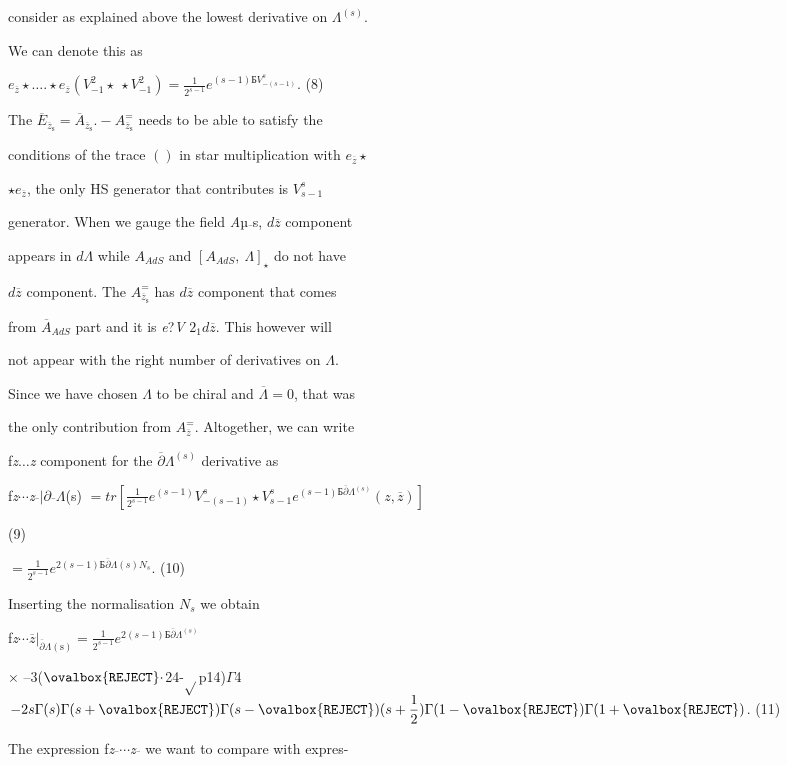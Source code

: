 \documentclass[a4paper,12pt]{article}
\begin{document}
consider as explained above the lowest derivative on $\Lambda^{(s)}.$

We can denote this as

$e_{\overline{z}}\star\ldots.\star e_{\overline{z}} (V_{-1}^{2}\displaystyle \star\ \star V_{-1}^{2})=\frac{1}{2^{s-1}}e^{(s-1)Б V_{-(s-1)}^{s}}$. (8)

The $\overline{E}_{\overline{z}_{\mathrm{s}}} = \overline{A}_{\overline{z}_{\mathrm{s}}}. -A_{\overline{z}_{\mathrm{s}}}^{=}$ needs to be able to satisfy the

conditions of the trace $()$ in star multiplication with $ e_{\overline{z}}\star$

$\star e_{\overline{z}}$, the only HS generator that contributes is $V_{s-1}^{s}$

generator. When we gauge the field {\it A}µ$\overline{}$s, $d\overline{z}$ component

appears in $ d\Lambda$ while $A_{AdS}$ and $[A_{AdS},\ \Lambda]_{\star}$ do not have

$d\overline{z}$ component. The $A_{\overline{z}_{\mathrm{s}}}^{=}$ has $d\overline{z}$ component that comes

from $\overline{A}_{AdS}$ part and it is {\it e}?{\it V} $2_{1}d\overline{z}$. This however will

not appear with the right number of derivatives on $\Lambda.$

Since we have chosen $\Lambda$ to be chiral and $\overline{\Lambda}=0$, that was

the only contribution from $A_{\overline{z}}^{=}$. Altogether, we can write

f{\it z}$\ldots${\it z} component for the $\overline{\partial}\Lambda^{(s)}$ derivative as

f{\it z}$\cdots${\it z}$\overline{}|\partial\overline{}\Lambda$(s) $=tr [\displaystyle \frac{1}{2^{s-1}}e^{(s-1)}V_{-(s-1)}^{s}\star V_{s-1}^{s}e^{(s-1)Б\overline{\partial}\Lambda^{(s)}}(z,\overline{z})]$

(9)
\begin{center}
$=\displaystyle \frac{1}{2^{s-1}}e^{2(s-1)Б\overline{\partial}\Lambda(s)N_{s}}$.   (10)
\end{center}
Inserting the normalisation $N_{s}$ we obtain

f{\it z}$\cdots \overline{z}|_{\overline{\partial}\Lambda(\mathrm{s})} =\displaystyle \frac{1}{2^{s-1}}e^{2(s-1)Б\overline{\partial}\Lambda^{(s)}}$
\begin{center}
$\times$ --3($\ovalbox{\tt\small REJECT}\cdot$24-$\sqrt{}$p14)$\Gamma$4 $-2s\displaystyle \Gamma(s)\Gamma(s+\ovalbox{\tt\small REJECT})\Gamma(s-\ovalbox{\tt\small REJECT})(s+\frac{1}{2})\Gamma(1-\ovalbox{\tt\small REJECT})\Gamma(1+\ovalbox{\tt\small REJECT})$.   (11)
\end{center}
The expression f{\it z}$\overline{}\cdots${\it z}$\overline{}$ we want to compare with expres-
\end{document}
